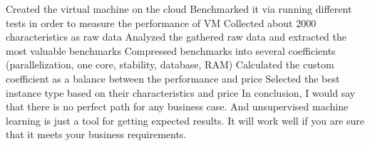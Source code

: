 \documentclass{article}
\begin{document}
Created the virtual machine on the cloud
Benchmarked it via running different tests in order to measure the performance of VM
Collected about 2000 characteristics as raw data
Analyzed the gathered raw data and extracted the most valuable benchmarks
Compressed benchmarks into several coefficients (parallelization, one core, stability, database, RAM)
Calculated the custom coefficient as a balance between the performance and price
Selected the best instance type based on their characteristics and price
In conclusion, I would say that there is no perfect path for any business case. And unsupervised machine learning is just a tool for getting expected results. It will work well if you are sure that it meets your business requirements.

\end{document}
